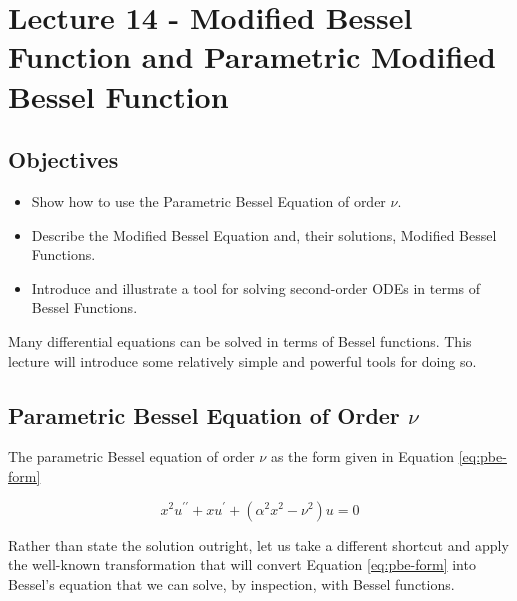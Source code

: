 \chapter{Lecture 14 - Modified Bessel Function and Parametric Modified Bessel Function}
\label{ch:lec14}
\section{Objectives}
\begin{itemize}
\item Show how to use the Parametric Bessel Equation of order $\nu$.
\item Describe the Modified Bessel Equation and, their solutions, Modified Bessel Functions.
\item Introduce and illustrate a tool for solving second-order ODEs in terms of Bessel Functions.
\end{itemize}

Many differential equations can be solved in terms of Bessel functions.  This lecture will introduce some relatively simple and powerful tools for doing so.

\section{Parametric Bessel Equation of Order $\nu$}
The parametric Bessel equation of order $\nu$ as the form given in Equation \ref{eq:pbe-form}

\begin{equation}
x^{2}u^{\prime \prime} + xu^{\prime} + \left(\alpha^2 x^2 - \nu^2 \right)u= 0
\label{eq:pbe-form}
\end{equation}

Rather than state the solution outright, let us take a different shortcut and apply the well-known transformation that will convert Equation \ref{eq:pbe-form} into Bessel's equation that we can solve, by inspection, with Bessel functions.

